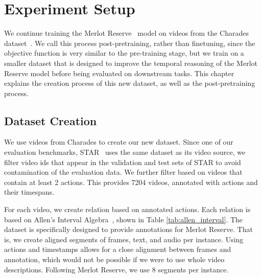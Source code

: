 \chapter{Experiment Setup}
\label{chap:setup}

We continue training the Merlot Reserve~\citep{zellers2022mreserve} model on
videos from the Charades dataset~\citep{sigurdsson2016charades}. We call this
process post-pretraining, rather than finetuning, since the objective function
is very similar to the pre-training stage, but we train on a smaller dataset
that is designed to improve the temporal reasoning of the Merlot Reserve model
before being evaluated on downstream tasks. This chapter explains the creation
process of this new dataset, as well as the post-pretraining process.

\section{Dataset Creation}
\label{sec:data}

We use videos from Charades to create our new dataset. Since one of our
evaluation benchmarks, STAR~\citep{wu2021star} uses the same dataset as its
video source, we filter video ids that appear in the validation and test sets
of STAR to avoid contamination of the evaluation data. We further filter based
on videos that contain at least 2 actions. This provides 7204 videos, annotated
with actions and their timespans.

For each video, we create relation based on annotated actions. Each relation is
based on Allen's Interval Algebra~\citep{allen1983interval}, shown in Table
\ref{tab:allen_interval}. The dataset is specifically designed to provide
annotations for Merlot Reserve. That is, we create aligned segments of frames,
text, and audio per instance. Using actions and timestamps allows for a close
alignment between frames and annotation, which would not be possible if we were
to use whole video descriptions. Following Merlot Reserve, we use 8 segments
per instance.

